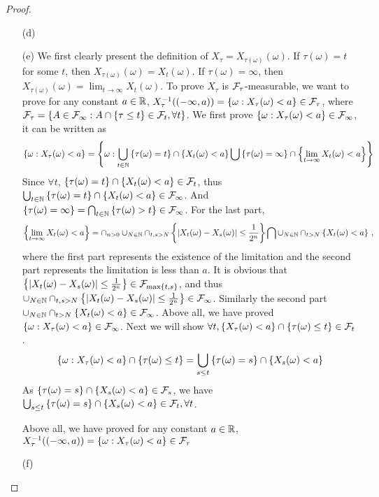 \begin{proof}
\begin{enumerate}
   \item[(d)] 
   \item[(e)] 
   We first clearly present the definition of $X_\tau = X_{\tau(\omega)}(\omega)$. If $\tau(\omega)=t$ for some $t$, then $X_{\tau(\omega)}(\omega) = X_t(\omega)$. If $\tau(\omega)=\infty$, then $X_{\tau(\omega)}(\omega) = \lim_{t \to \infty} X_t(\omega)$. To prove $X_\tau$ is $\mathcal{F}_{\tau}$-measurable, we want to prove for any constant $a\in \mathbb{R}$, $X_{\tau}^{-1}((-\infty, a)) = \left\{ \omega: X_{\tau}(\omega)<a \right\} \in \mathcal{F}_{\tau}$, where $\mathcal{F}_{\tau} = \left\{ A\in \mathcal{F}_{\infty}: A\cap \left\{ \tau \le t \right\} \in \mathcal{F}_t, \forall t \right\}$. We first prove $\left\{ \omega: X_{\tau}(\omega)<a \right\} \in \mathcal{F}_{\infty}$, it can be written as 
   \begin{align*}
    \left\{ \omega: X_{\tau}(\omega)<a \right\} = \left\{ \omega: \bigcup_{t\in \mathbb{N}}\left\{ \tau(\omega)=t \right\}\cap\left\{ X_t(\omega)<a \right\} \bigcup \left\{ \tau(\omega)=\infty \right\}\cap \left\{ \lim_{t\to \infty}X_t(\omega)<a  \right\}   \right\}
   \end{align*}
   Since $\forall t$, $\left\{ \tau(\omega)=t \right\}\cap\left\{ X_t(\omega)<a \right\} \in \mathcal{F}_{t}$, thus  $\bigcup_{t\in \mathbb{N}}\left\{ \tau(\omega)=t \right\}\cap\left\{ X_t(\omega)<a \right\} \in \mathcal{F}_{\infty}$. And $\left\{ \tau(\omega)=\infty \right\} = \bigcap_{t \in \mathbb{N}}\left\{ \tau(\omega)>t \right\} \in \mathcal{F}_{\infty}$. For the last part, 
  \begin{align*}
    \left\{ \lim_{t\to \infty}X_t(\omega)<a  \right\}  = \cap_{n>0}\cup_{N \in \mathbb{N}} \cap_{t,s > N} \left\{ \left| X_t(\omega)-X_s(\omega) \right|\le \frac{1}{2^n}  \right\} \bigcap \cup_{N\in \mathbb{N}}\cap_{t>N}\left\{ X_t(\omega) < a \right\}\,,
   \end{align*}
   where the first part represents the existence of the limitation and the second part represents the limitation is less than $a$. It is obvious that $\left\{ \left| X_t(\omega)-X_s(\omega) \right|\le \frac{1}{2^n}  \right\} \in \mathcal{F}_{\max\left\{ t,s \right\}}$, and thus $\cup_{N \in \mathbb{N}} \cap_{t,s > N} \left\{ \left| X_t(\omega)-X_s(\omega) \right|\le \frac{1}{2^n}  \right\} \in \mathcal{F}_{\infty}$. Similarly the second part $\cup_{N\in \mathbb{N}}\cap_{t>N}\left\{ X_t(\omega) < a \right\} \in \mathcal{F}_{\infty}$. Above all, we have proved $\left\{ \omega: X_{\tau}(\omega)<a \right\} \in \mathcal{F}_{\infty}$. Next we will show $\forall t, \left\{  X_{\tau}(\omega)<a \right\} \cap \left\{ \tau(\omega) \le t \right\} \in \mathcal{F}_t $. 
   \begin{align}
      \left\{ \omega: X_{\tau}(\omega)<a \right\} \cap \left\{ \tau(\omega) \le t \right\}  = \bigcup_{s\le t} \left\{ \tau(\omega)=s \right\}\cap\left\{ X_{s}(\omega)<a \right\}
   \end{align}
   As $\left\{ \tau(\omega)=s \right\}\cap\left\{ X_{s}(\omega)<a \right\} \in \mathcal{F}_{s}$, we have $\bigcup_{s\le t} \left\{ \tau(\omega)=s \right\}\cap\left\{ X_{s}(\omega)<a \right\} \in \mathcal{F}_t, \forall t$. 

   Above all, we have proved for any constant $a\in \mathbb{R}$, $X_{\tau}^{-1}((-\infty, a)) = \left\{ \omega: X_{\tau}(\omega)<a \right\} \in \mathcal{F}_{\tau}$



   \item[(f)]
\end{enumerate}


\end{proof}






